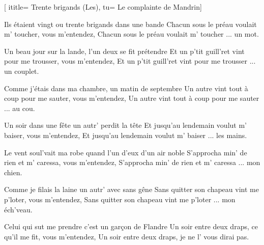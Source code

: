  [
ititle= {Trente brigands (Les)},
tu= {Le complainte de Mandrin}]


\beginverse
Ils étaient vingt ou trente brigands dans une bande
Chacun sous le préau voulait m' toucher, vous m'entendez,
Chacun sous le préau voulait m' toucher ... un mot.
\endverse

\beginverse
Un beau jour sur la lande, l'un deux se fit prétendre
Et un p'tit guill'ret vint pour me trousser, vous m'entendez,
Et un p'tit guill'ret vint pour me trousser ... un couplet.
\endverse

\beginverse
Comme j'étais dans ma chambre, un matin de septembre
Un autre vint tout à coup pour me sauter, vous m'entendez,
Un autre vint tout à coup pour me sauter ... au cou.
\endverse

\beginverse
Un soir dans une fête un autr' perdit la tête
Et jusqu'au lendemain voulut m' baiser, vous m'entendez,
Et jusqu'au lendemain voulut m' baiser ... les mains.
\endverse

\beginverse
Le vent soul'vait ma robe quand l'un d'eux d'un air noble
S'approcha min' de rien et m' caressa, vous m'entendez,
S'approcha min' de rien et m' caressa ... mon chien.
\endverse

\beginverse
Comme je filais la laine un autr' avec sans gêne
Sans quitter son chapeau vint me p'loter, vous m'entendez,
Sans quitter son chapeau vint me p'loter ... mon éch'veau.
\endverse

\beginverse
Celui qui sut me prendre c'est un garçon de Flandre
Un soir entre deux draps, ce qu'il me fit, vous m'entendez,
Un soir entre deux draps, je ne l' vous dirai pas.
\endverse

\endsong